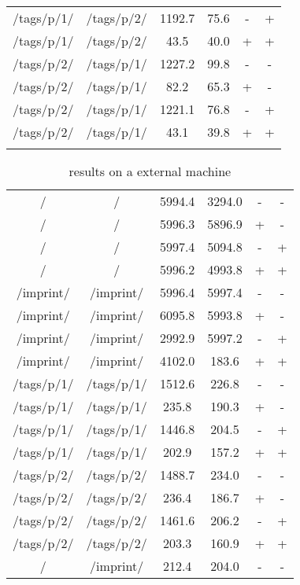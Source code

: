 \begin{appendix}
\begin{center}
\begin{longtable}{cccccc}
/tags/p/1/ & /tags/p/2/ & 1192.7 & 75.6 & - & + \\
/tags/p/1/ & /tags/p/2/ & 43.5 & 40.0 & + & + \\
\hline
/tags/p/2/ & /tags/p/1/ & 1227.2 & 99.8 & - & - \\
/tags/p/2/ & /tags/p/1/ & 82.2 & 65.3 & + & - \\
/tags/p/2/ & /tags/p/1/ & 1221.1 & 76.8 & - & + \\
/tags/p/2/ & /tags/p/1/ & 43.1 & 39.8 & + & + \\
\hline
\label{tab:curl_results_local}
\end{longtable}
\end{center}

\newpage{}

\begin{center}
\footnotesize
\begin{longtable}{cccccc}
    \caption{\curl{} results on a external machine}
    \\
	\hline
	\thead{From} & \thead{To} & \thead{Common} & \thead{\lare{}} & \thead{DC} & \thead{TC}\\
	\hline
/ & / & 5994.4 & 3294.0 & - & - \\
/ & / & 5996.3 & 5896.9 & + & - \\
/ & / & 5997.4 & 5094.8 & - & + \\
/ & / & 5996.2 & 4993.8 & + & + \\
\hline
/imprint/ & /imprint/ & 5996.4 & 5997.4 & - & - \\
/imprint/ & /imprint/ & 6095.8 & 5993.8 & + & - \\
/imprint/ & /imprint/ & 2992.9 & 5997.2 & - & + \\
/imprint/ & /imprint/ & 4102.0 & 183.6 & + & + \\
\hline
/tags/p/1/ & /tags/p/1/ & 1512.6 & 226.8 & - & - \\
/tags/p/1/ & /tags/p/1/ & 235.8 & 190.3 & + & - \\
/tags/p/1/ & /tags/p/1/ & 1446.8 & 204.5 & - & + \\
/tags/p/1/ & /tags/p/1/ & 202.9 & 157.2 & + & + \\
\hline
/tags/p/2/ & /tags/p/2/ & 1488.7 & 234.0 & - & - \\
/tags/p/2/ & /tags/p/2/ & 236.4 & 186.7 & + & - \\
/tags/p/2/ & /tags/p/2/ & 1461.6 & 206.2 & - & + \\
/tags/p/2/ & /tags/p/2/ & 203.3 & 160.9 & + & + \\
\hline
\hline
/ & /imprint/ & 212.4 & 204.0 & - & - \\

\end{longtable}
\end{center}
\end{appendix}

